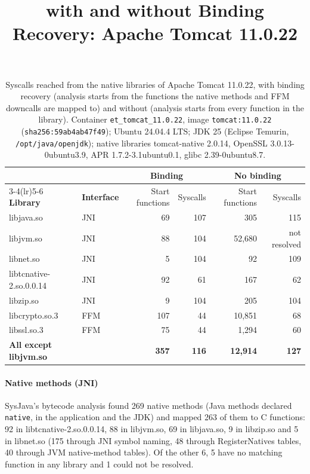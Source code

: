 \documentclass[10pt]{article}
\title{\sysname with and without Binding Recovery: Apache Tomcat 11.0.22}
\author{}
\date{\vspace{-8ex}}
\newcommand{\sysname}{SysJava\xspace}
\begin{document}
\maketitle

\begin{table}[H]
\centering
\caption{Syscalls reached from the native libraries of Apache Tomcat 11.0.22, with binding recovery (analysis starts from the functions the native methods and FFM downcalls are mapped to) and without (analysis starts from every function in the library). Container \texttt{et\_tomcat\_11.0.22}, image \texttt{tomcat:11.0.22} (\texttt{sha256:59ab4ab47f49}); Ubuntu 24.04.4 LTS; JDK 25 (Eclipse Temurin, \texttt{/opt/java/openjdk}); native libraries tomcat-native 2.0.14, OpenSSL 3.0.13-0ubuntu3.9, APR 1.7.2-3.1ubuntu0.1, glibc 2.39-0ubuntu8.7.}
\label{tab:binding-tomcat-11-0-22}
\begin{tabular}{llrrrr}
\toprule
 &  & \multicolumn{2}{c}{\textbf{Binding}} & \multicolumn{2}{c}{\textbf{No binding}} \\
\cmidrule(lr){3-4}\cmidrule(lr){5-6}
\textbf{Library} & \textbf{Interface} & Start functions & Syscalls & Start functions & Syscalls \\
\midrule
libjava.so & JNI & 69 & 107 & 305 & 115 \\
libjvm.so & JNI & 88 & 104 & 52,680 & not resolved \\
libnet.so & JNI & 5 & 104 & 92 & 109 \\
libtcnative-2.so.0.0.14 & JNI & 92 & 61 & 167 & 62 \\
libzip.so & JNI & 9 & 104 & 205 & 104 \\
libcrypto.so.3 & FFM & 107 & 44 & 10,851 & 68 \\
libssl.so.3 & FFM & 75 & 44 & 1,294 & 60 \\
\textbf{All except libjvm.so} &  & \textbf{357} & \textbf{116} & \textbf{12,914} & \textbf{127} \\
\bottomrule
\end{tabular}
\end{table}

\paragraph*{Native methods (JNI)}
\sysname's bytecode analysis found 269 native methods (Java methods declared \texttt{native}, in the application and the JDK) and mapped 263 of them to C functions: 92 in libtcnative-2.so.0.0.14, 88 in libjvm.so, 69 in libjava.so, 9 in libzip.so and 5 in libnet.so (175 through JNI symbol naming, 48 through RegisterNatives tables, 40 through JVM native-method tables). Of the other 6, 5 have no matching function in any library and 1 could not be resolved.
\end{document}
